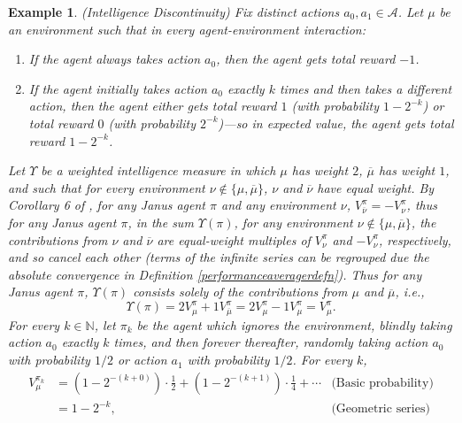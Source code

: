 \documentclass{article}
\newtheorem{example}[theorem]{Example}
\begin{document}
\begin{example}
    (Intelligence Discontinuity)
    Fix distinct actions $a_0,a_1\in\mathcal A$.
    Let $\mu$ be an environment such that in every agent-environment interaction:
    \begin{enumerate}
        \item If the agent always takes action $a_0$, then the agent gets total reward $-1$.
        \item If the agent initially takes action $a_0$ exactly $k$ times and
            then takes a different action, then the agent either
            gets total reward $1$ (with probability $1-2^{-k}$)
            or total reward $0$ (with probability $2^{-k}$)---so in expected
            value, the agent gets total reward $1-2^{-k}$.
    \end{enumerate}
    Let $\Upsilon$ be a weighted intelligence measure in which $\mu$ has weight $2$,
    $\overline\mu$ has weight $1$, and such that for every
    environment $\nu\not\in\{\mu,\overline{\mu}\}$, $\nu$ and $\overline{\nu}$ have
    equal weight.
    By Corollary 6 of \cite{alexander2021reward}, for any Janus agent $\pi$ and
    any environment $\nu$, $V^\pi_{\overline\nu}=-V^\pi_{\nu}$, thus for any Janus agent $\pi$,
    in the sum $\Upsilon(\pi)$, for any environment $\nu\not\in\{\mu,\overline{\mu}\}$,
    the contributions from $\nu$ and $\overline\nu$ are equal-weight multiples of
    $V^\pi_{\nu}$ and $-V^\pi_{\nu}$,
    respectively, and so cancel each other
    (terms of the infinite series can be regrouped due the absolute convergence
    in Definition \ref{performanceaveragerdefn}).
    Thus for any Janus agent $\pi$,
    $\Upsilon(\pi)$ consists solely of the contributions from $\mu$ and $\overline\mu$,
    i.e.,
    \[
        \Upsilon(\pi)=2V^\pi_\mu+1V^\pi_{\overline\mu}
        =2V^\pi_\mu-1V^\pi_{\mu}=V^\pi_\mu.
    \]
    For every $k\in\mathbb N$, let $\pi_k$ be the agent which ignores the environment,
    blindly taking action $a_0$ exactly $k$ times, and then forever thereafter,
    randomly taking action $a_0$ with probability $1/2$ or action $a_1$ with probability
    $1/2$.
    For every $k$,
    \begin{align*}
        V^{\pi_k}_\mu
            &= (1-2^{-(k+0)})\cdot \mbox{$\frac12$}
                +(1-2^{-(k+1)})\cdot\mbox{$\frac14$} + \cdots
                    &\mbox{(Basic probability)}\\
            &= 1-2^{-k},
                    &\mbox{(Geometric series)}
    \end{align*}

\end{example}
\end{document}
